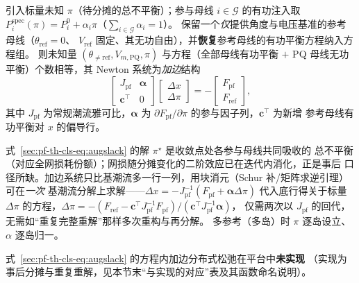 \begin{proposition}[加边分布式松弛系统]\label{prop:pf-th-cls-augslack}
引入标量未知 $\pi$（待分摊的总不平衡）；参与母线 $i\in\mathcal G$ 的有功注入取
$P_i^{\mathrm{spec}}(\pi)=P_i^0+\alpha_i\pi$（$\sum_{i\in\mathcal G}\alpha_i=1$）。
保留一个\emph{仅}提供角度与电压基准的参考母线（$\theta_{\mathrm{ref}}=0$、
$V_{\mathrm{ref}}$ 固定、其无功自由），并\textbf{恢复}参考母线的有功平衡方程纳入方程组。
则未知量 $(\theta_{\ne\mathrm{ref}},V_{m,\mathrm{PQ}},\pi)$ 与方程（全部母线有功平衡
$+$ PQ 母线无功平衡）个数相等，其 Newton 系统为\emph{加边}结构
\begin{equation}
\begin{bmatrix} J_{\mathrm{pf}} & \boldsymbol\alpha\\[2pt]
\boldsymbol c^{\top} & 0\end{bmatrix}
\begin{bmatrix}\Delta x\\ \Delta\pi\end{bmatrix}
=-\begin{bmatrix}F_{\mathrm{pf}}\\ F_{\mathrm{ref}}\end{bmatrix},
\label{sec:pf-th-cls-eq:augslack}
\end{equation}
其中 $J_{\mathrm{pf}}$ 为常规潮流雅可比，$\boldsymbol\alpha$ 为
$\partial F_{\mathrm{pf}}/\partial\pi$ 的参与因子列，$\boldsymbol c^{\top}$ 为新增
参考母线有功平衡对 $x$ 的偏导行。
\end{proposition}

\begin{remark}[自洽性与加边求解]\label{rem:pf-th-cls-augslack}
式~\eqref{sec:pf-th-cls-eq:augslack} 的解 $\pi^\star$ 是收敛点处各参与母线共同吸收的
总不平衡（对应全网损耗份额）；网损随分摊变化的二阶效应已在迭代内消化，正是事后
口径所缺。加边系统只比基潮流多一行一列，用块消元（Schur 补/矩阵求逆引理）可在\emph{一次}
基潮流分解上求解——$\Delta x=-J_{\mathrm{pf}}^{-1}(F_{\mathrm{pf}}+\boldsymbol\alpha\Delta\pi)$
代入底行得关于标量 $\Delta\pi$ 的方程，$\Delta\pi=-(F_{\mathrm{ref}}-\boldsymbol c^{\top}
J_{\mathrm{pf}}^{-1}F_{\mathrm{pf}})/(\boldsymbol c^{\top}J_{\mathrm{pf}}^{-1}\boldsymbol\alpha)$，
仅需两次以 $J_{\mathrm{pf}}$ 的回代，无需如“重复完整重解”那样多次重构与再分解。
多参考（多岛）时 $\pi$ 逐岛设立、$\alpha$ 逐岛归一。
\end{remark}

\begin{gapnote}
式~\eqref{sec:pf-th-cls-eq:augslack} 的方程内加边分布式松弛在平台中\textbf{未实现}
（实现为事后分摊与重复重解，见本节末“与实现的对应”表及其函数命名说明）。
\end{gapnote}

